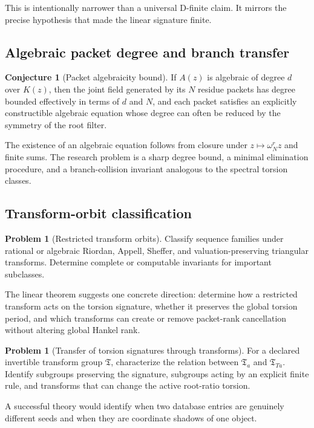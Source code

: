 \documentclass[11pt]{article}
\theoremstyle{definition}\newtheorem{definition}[theorem]{Definition}\newtheorem{example}[theorem]{Example}\newtheorem{construction}[theorem]{Construction}\newtheorem{algorithm}[theorem]{Algorithm}\newtheorem{conjecture}[theorem]{Conjecture}\newtheorem{problem}[theorem]{Problem}
\theoremstyle{remark}\newtheorem{remark}[theorem]{Remark}\newtheorem{boundary}[theorem]{Boundary}\newtheorem{certificate}[theorem]{Computational Certificate}\newtheorem{classical}[theorem]{Classical Input}\newtheorem{principle}[theorem]{Structural Principle}
\begin{document}
This is intentionally narrower than a universal D-finite claim.  It mirrors the precise hypothesis that made the linear signature finite.

\subsection{Algebraic packet degree and branch transfer}
\begin{conjecture}[Packet algebraicity bound]
If $A(z)$ is algebraic of degree $d$ over $K(z)$, then the joint field generated by its $N$ residue packets has degree bounded effectively in terms of $d$ and $N$, and each packet satisfies an explicitly constructible algebraic equation whose degree can often be reduced by the symmetry of the root filter.
\end{conjecture}

The existence of an algebraic equation follows from closure under $z\mapsto\omega_N^rz$ and finite sums.  The research problem is a sharp degree bound, a minimal elimination procedure, and a branch-collision invariant analogous to the spectral torsion classes.

\subsection{Transform-orbit classification}
\begin{problem}[Restricted transform orbits]
Classify sequence families under rational or algebraic Riordan, Appell, Sheffer, and valuation-preserving triangular transforms.  Determine complete or computable invariants for important subclasses.
\end{problem}

The linear theorem suggests one concrete direction: determine how a restricted transform acts on the torsion signature, whether it preserves the global torsion period, and which transforms can create or remove packet-rank cancellation without altering global Hankel rank.

\begin{problem}[Transfer of torsion signatures through transforms]
For a declared invertible transform group $\mathfrak T$, characterize the relation between $\mathfrak T_a$ and $\mathfrak T_{Ta}$.  Identify subgroups preserving the signature, subgroups acting by an explicit finite rule, and transforms that can change the active root-ratio torsion.
\end{problem}

A successful theory would identify when two database entries are genuinely different seeds and when they are coordinate shadows of one object.
\end{document}
